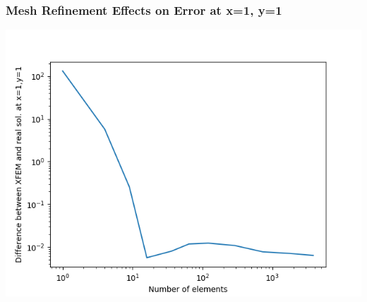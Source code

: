 \documentclass[]{beamer}
\begin{document}
\begin{frame}[t]\frametitle{Mesh Refinement Effects on Error at x=1, y=1}
	\begin{center}
		\includegraphics[scale=0.5]{figures/2D_rz_ls1mat_neumann_comp}
	\end{center}
\end{frame}
\end{document}
